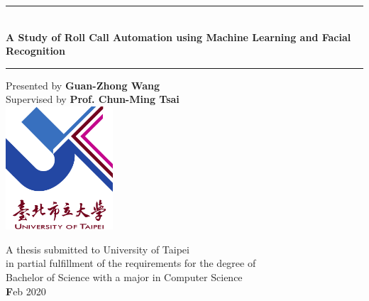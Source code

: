 \def\title{A Study of Roll Call Automation using Machine Learning and Facial Recognition}
\def\author{Guan-Zhong Wang}
\def\supervisor{Prof. Chun-Ming Tsai}
\def\date{Feb 2020}

\begin{titlepage}
  \begin{center}
    \rule{16cm}{1.5pt}\\
    \vspace*{0.5cm}
    \textbf{\huge \title}
    \vspace*{0.5cm}
    \noindent\rule{16cm}{1.5pt}
    \vspace{0.5cm}

    {\large Presented by} \textbf{\Large \author}\\
    \vspace{0.3cm}
    {\large Supervised by} \textbf{\Large \supervisor}\\

    \vspace{2.0cm}
    \includegraphics[width=0.3\textwidth]{figures/utaipei.png}
    \vspace{1.5cm}

    \vfill

    {\Large A thesis submitted to University of Taipei\\
      in partial fulfillment of the requirements for the degree of\\
      Bachelor of Science with a major in Computer Science\\
    }
    \vspace{1.2cm}
    {\Large \textbf\date}

    \vspace{3.5cm}

  \end{center}
\end{titlepage}
